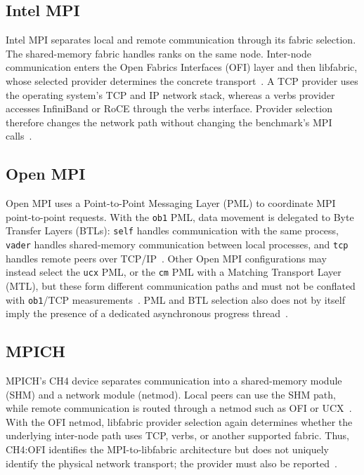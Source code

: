 \subsection{Intel MPI}

Intel MPI separates local and remote communication through its fabric
selection. The shared-memory fabric handles ranks on the same node. Inter-node
communication enters the Open Fabrics Interfaces (OFI) layer and then
libfabric, whose selected provider determines the concrete transport~\cite{intelFabricsControl,intelOfiProviders}. A TCP
provider uses the operating system's TCP and IP network stack, whereas a verbs provider
accesses InfiniBand or RoCE through the verbs interface. Provider selection
therefore changes the network path without changing the benchmark's MPI calls~\cite{intelOfiProviders}.

\subsection{Open MPI}

Open MPI uses a Point-to-Point Messaging Layer (PML) to coordinate MPI
point-to-point requests. With the \texttt{ob1} PML, data movement is delegated
to Byte Transfer Layers (BTLs): \texttt{self} handles communication with the
same process, \texttt{vader} handles shared-memory communication between local
processes, and \texttt{tcp} handles remote peers over TCP/IP~\cite{openmpiNetworkArchitecture,openmpiTcpFaq}. Other Open MPI
configurations may instead select the \texttt{ucx} PML, or the \texttt{cm} PML
with a Matching Transport Layer (MTL), but these form different communication
paths and must not be conflated with \texttt{ob1}/TCP measurements~\cite{openmpiNetworkArchitecture}. PML and BTL
selection also does not by itself imply the presence of a dedicated
asynchronous progress thread~\cite{openmpi418TcpProgress}.

\subsection{MPICH}

MPICH's CH4 device separates communication into a shared-memory module (SHM)
and a network module (netmod). Local peers can use the SHM path, while remote
communication is routed through a netmod such as OFI or UCX~\cite{mpichDeveloperGuide}. With the OFI
netmod, libfabric provider selection again determines whether the underlying
inter-node path uses TCP, verbs, or another supported fabric. Thus, CH4:OFI
identifies the MPI-to-libfabric architecture but does not uniquely identify
the physical network transport; the provider must also be reported~\cite{mpichDeveloperGuide,intelOfiProviders}.


